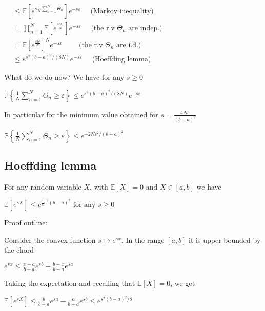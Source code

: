$
\begin{aligned}
& \leq \mathbb{E}\left[e^{s \frac{1}{N} \sum_{n=1}^{N} \Theta_{n}}\right] e^{-s \varepsilon} \quad \text { (Markov inequality) } \\
& =\prod_{n=1}^{N} \mathbb{E}\left[e^{\frac{s \Theta_{n}}{N}}\right] e^{-s \varepsilon} \quad \text { (the r.v } \Theta_{n} \text { are indep.) } \\
& =\mathbb{E}\left[e^{\frac{s \Theta}{N}}\right]^{N} e^{-s \varepsilon} \quad \quad \text { (the r.v } \Theta_{n} \text { are i.d.) } \\
& \leq e^{s^{2}(b-a)^{2} /(8 N)} e^{-s \varepsilon} \quad \text { (Hoeffding lemma) }
\end{aligned}
$

What do we do now? We have for any $s \geq 0$

$
\mathbb{P}\left\{\frac{1}{N} \sum_{n=1}^{N} \Theta_{n} \geq \varepsilon\right\} \leq e^{s^{2}(b-a)^{2} /(8 N)} e^{-s \varepsilon}
$

In particular for the minimum value obtained for $s=\frac{4 N \varepsilon}{(b-a)^{2}}$

$
\mathbb{P}\left\{\frac{1}{N} \sum_{n=1}^{N} \Theta_{n} \geq \varepsilon\right\} \leq e^{-2 N \varepsilon^{2} /(b-a)^{2}}
$

\subsection*{Hoeffding lemma}
For any random variable $X$, with $\mathbb{E}[X]=0$ and $X \in[a, b]$ we have

$
\mathbb{E}\left[e^{s X}\right] \leq e^{\frac{1}{8} s^{2}(b-a)^{2}} \text { for any } s \geq 0
$

Proof outline:

Consider the convex function $s \mapsto e^{s x}$. In the range $[a, b]$ it is upper bounded by the chord

$
e^{s x} \leq \frac{x-a}{b-a} e^{s b}+\frac{b-x}{b-a} e^{s a}
$

Taking the expectation and recalling that $\mathbb{E}[X]=0$, we get

$
\mathbb{E}\left[e^{s X}\right] \leq \frac{b}{b-a} e^{s a}-\frac{a}{b-a} e^{s b} \leq e^{s^{2}(b-a)^{2} / 8}
$
